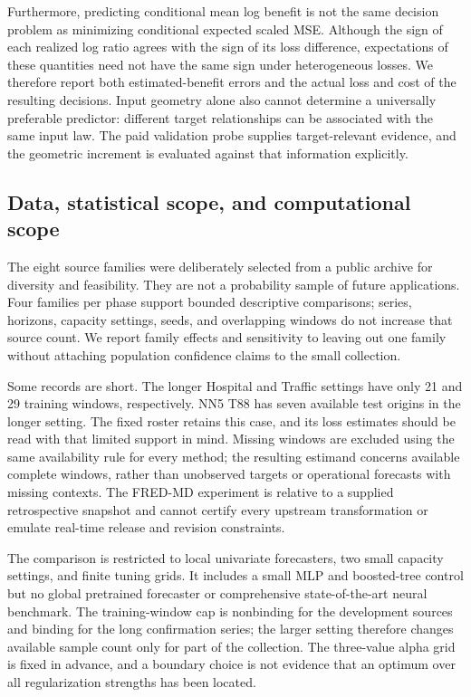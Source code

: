 Furthermore, predicting conditional mean log benefit is not the same
decision problem as minimizing conditional expected scaled MSE. Although
the sign of each realized log ratio agrees with the sign of its loss
difference, expectations of these quantities need not have the same sign
under heterogeneous losses. We therefore report both estimated-benefit
errors and the actual loss and cost of the resulting decisions. Input
geometry alone also cannot determine a universally preferable predictor:
different target relationships can be associated with the same input law.
The paid validation probe supplies target-relevant evidence, and the
geometric increment is evaluated against that information explicitly.

\subsection{Data, statistical scope, and computational scope}
The eight source families were deliberately selected from a public archive
for diversity and feasibility. They are not a probability sample of future
applications. Four families per phase support bounded descriptive comparisons;
series, horizons, capacity settings, seeds, and overlapping windows do not
increase that source count. We report family effects and sensitivity to
leaving out one family without attaching population confidence claims to
the small collection.

Some records are short. The longer Hospital and Traffic settings have only
21 and 29 training windows, respectively. NN5 T88 has seven available test
origins in the longer setting. The fixed roster retains this case, and its
loss estimates should be read with that limited support in mind. Missing
windows are excluded using the same availability rule for every method;
the resulting estimand concerns available complete windows, rather than
unobserved targets or operational forecasts with missing contexts. The
FRED-MD experiment is relative to a supplied retrospective snapshot and
cannot certify every upstream transformation or emulate real-time release
and revision constraints.

The comparison is restricted to local univariate forecasters, two small
capacity settings, and finite tuning grids. It includes a small MLP and
boosted-tree control but no global pretrained forecaster or comprehensive
state-of-the-art neural benchmark. The training-window cap is nonbinding
for the development sources and binding for the long confirmation series;
the larger setting therefore changes available sample count only for part
of the collection. The three-value alpha grid is fixed in advance, and a
boundary choice is not evidence that an optimum over all regularization
strengths has been located.


